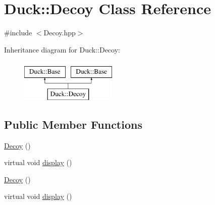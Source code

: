 \hypertarget{classDuck_1_1Decoy}{\section{Duck\-:\-:Decoy Class Reference}
\label{classDuck_1_1Decoy}
}


{\ttfamily \#include $<$Decoy.\-hpp$>$}

Inheritance diagram for Duck\-:\-:Decoy\-:\begin{figure}[H]
\begin{center}
\leavevmode
\includegraphics[height=2.000000cm]{classDuck_1_1Decoy}
\end{center}
\end{figure}
\subsection*{Public Member Functions}
\begin{DoxyCompactItemize}
\item 
\hyperlink{classDuck_1_1Decoy_aa51e0609ff8d86843f38dc0125291d9a}{Decoy} ()
\item 
virtual void \hyperlink{classDuck_1_1Decoy_adcd17c2c863795f61a9b256663d9d11c}{display} ()
\item 
\hyperlink{classDuck_1_1Decoy_aa51e0609ff8d86843f38dc0125291d9a}{Decoy} ()
\item 
virtual void \hyperlink{classDuck_1_1Decoy_a4f6d7266f03b7f9d8aab037bb6a91e4d}{display} ()
\end{DoxyCompactItemize}
